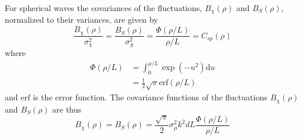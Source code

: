 For spherical waves the covariances of the fluctuations, $B_{\chi}(\rho)$ and
$B_{S}(\rho)$, normalized to their variances, are given by
\begin{equation}
 \frac{B_{\chi} (\rho)}{\sigma_{\chi}^2} = \frac{B_{S} (\rho)}{\sigma_{S}^2} = \frac{\Phi\left(\rho/L\right)}{\rho/L} = C_{sp}(\rho)
\end{equation}
where
\begin{align}\label{eq:gaussian_correlation}
 \Phi \left(\rho/L \right) &= \int_0^{\rho/L} \exp{\left(-u^2\right)} \mathrm{d} u  \\
 &= \frac{1}{2} \sqrt{\pi} \mathrm{erf}\left( \rho/L \right)
\end{align}
and $\mathrm{erf}$ is the error function.
The covariance functions of the fluctuations $B_{\chi}(\rho)$ and $B_{S}(\rho)$ are thus
\begin{equation}\label{eq:variances}
 B_{\chi} (\rho) = B_{S}(\rho) = \frac{\sqrt{\pi}}{2} \sigma_{\mu}^2 k^2 d L
\frac{\Phi(\rho/L) }{\rho / L}
\end{equation}

